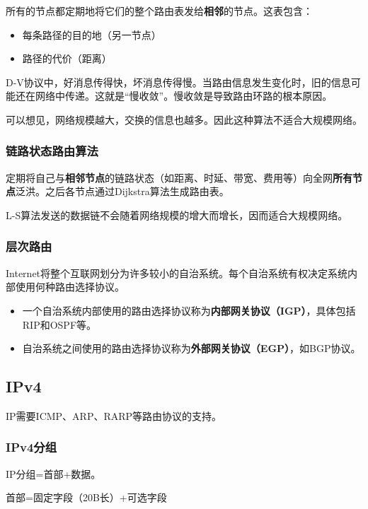 \documentclass[12pt, a4paper, oneside]{ctexart}
\begin{document}
所有的节点都定期地将它们的整个路由表发给\textbf{相邻}的节点。这表包含：
\begin{itemize}
    \item 每条路径的目的地（另一节点）
    \item 路径的代价（距离）
\end{itemize}

D-V协议中，好消息传得快，坏消息传得慢。当路由信息发生变化时，旧的信息可能还在网络中传递。这就是“慢收敛”。慢收敛是导致路由环路的根本原因。

可以想见，网络规模越大，交换的信息也越多。因此这种算法不适合大规模网络。

\subsubsection{链路状态路由算法}

定期将自己与\textbf{相邻节点}的链路状态（如距离、时延、带宽、费用等）向全网\textbf{所有节点}泛洪。之后各节点通过Dijkstra算法生成路由表。

L-S算法发送的数据链不会随着网络规模的增大而增长，因而适合大规模网络。

\subsubsection{层次路由}

Internet将整个互联网划分为许多较小的自治系统。每个自治系统有权决定系统内部使用何种路由选择协议。
\begin{itemize}
    \item 一个自治系统内部使用的路由选择协议称为\textbf{内部网关协议（IGP）}，具体包括RIP和OSPF等。
    \item 自治系统之间使用的路由选择协议称为\textbf{外部网关协议（EGP）}，如BGP协议。
\end{itemize}

\subsection{IPv4}

IP需要ICMP、ARP、RARP等路由协议的支持。

\subsubsection{IPv4分组}

IP分组=首部+数据。

首部=固定字段（20B长）+可选字段
\end{document}
